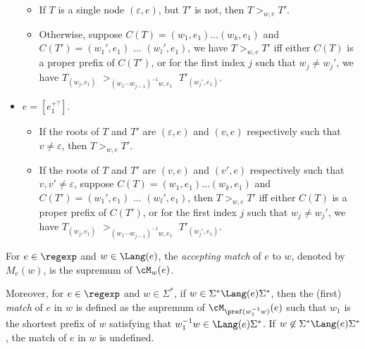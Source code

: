 \begin{definition}
\begin{itemize}
\begin{itemize}
		\item If $T$ is a single node  $(\varepsilon, e)$, but $T'$ is not, then $T >_{w, e} T'$.
  		\item Otherwise, suppose $C(T) = (w_1, e_1) \ldots (w_k, e_1)$ and $C (T') =
  		(w_1', e_1)$ $\ldots$ $(w_l', e_1)$, we have $T >_{w,e} T'$ iff either $C (T)$
  		is a proper prefix of $C (T')$, or for the first index $j$ such that $w_j
  		\neq w_j'$, we have $T_{(w_j, e_1)}$ $>_{(w_1\cdots w_{j-1})^{-1}w, e_1}$ $T'_{(w_j', e_1)}$.
		\end{itemize}
%
  		\item $e = [e_1^{+?}]$. 
		\begin{itemize}
		\item If the roots of $T$ and $T' $ are  $(\varepsilon, e)$ and $(v, e)$ respectively such that $v \neq \varepsilon$, then $T >_{w, e} T'$.
  		\item If the roots of $T$ and $T' $ are $(v, e)$ and $(v', e)$ respectively such that $v, v' \neq \varepsilon$,  suppose $C(T) = (w_1, e_1) \ldots (w_k, e_1)$ and $C (T') =
  		(w_1', e_1)$ $\ldots$ $(w_l', e_1)$, then $T >_{w,e} T'$ iff either $C(T)$
  		is a proper prefix of $C (T')$, or for the first index $j$ such that $w_j
  		\neq w_j'$, we have $T_{(w_j, e_1)}$ $>_{(w_1\cdots w_{j-1})^{-1}w, e_1}$ $T'_{(w_j', e_1)}$.
		\end{itemize}
  	\end{itemize}
  	
  	For $e \in \regexp$ and $w \in \Lang(e)$, the \emph{accepting match} of $e$ to $w$, denoted by $M_e(w)$, is the supremum of $\cM_w(e)$.
  	
  	 Moreover,  for $e \in \regexp$ and $w \in \Sigma^\ast$, if $w \in \Sigma^\ast \Lang(e)\Sigma^\ast$, then the (first) \emph{match} of $e$ in $w$ is defined as the supremum of $\cM_{\pref(w_1^{-1}w)}(e)$ such that $w_1$ is the shortest prefix of $w$ satisfying that $w_1^{-1}w \in \Lang(e)\Sigma^\ast$. If $w \not \in \Sigma^\ast \Lang(e)\Sigma^\ast$, the match of $e$ in $w$ is undefined.  
%  	
  \end{definition}

